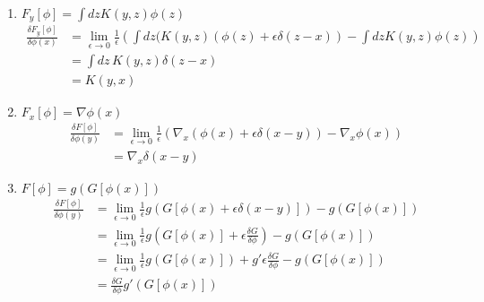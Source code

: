 \documentclass[../main.tex]{subfiles}
\begin{document}
\begin{enumerate}
    
    \item $F_y[\phi]=\int dz K(y,z)\phi(z)$
    \begin{align}
        \frac{\delta F_y[\phi]}{\delta\phi(x)}
           &=\lim_{\epsilon\rightarrow0}\frac{1}{\epsilon}\left(\int dz(K(y,z)(\phi(z)+\epsilon\delta(z-x)) -\int dz K(y,z)\phi(z)\right)\\
           &=\int dz\,K(y,z)\delta(z-x)\\
           &=K(y,x)
    \end{align}
    \item $F_x[\phi]=\nabla\phi(x)$
    \begin{align}
        \frac{\delta F[\phi]}{\delta\phi(y)}
        &=\lim_{\epsilon\rightarrow0}\frac{1}{\epsilon}\left( \nabla_x(\phi(x)+\epsilon\delta(x-y)) - \nabla_x\phi(x)\right)\\
        &=\nabla_x\delta(x-y)
    \end{align}
    \item $F[\phi]=g\left(G[\phi(x)]\right)$
    \begin{align}
        \frac{\delta F[\phi]}{\delta\phi(y)}
        &=\lim_{\epsilon\rightarrow0}\frac{1}{\epsilon}g(G[\phi(x)+\epsilon\delta(x-y)])-g(G[\phi(x)])\\
        &=\lim_{\epsilon\rightarrow0}\frac{1}{\epsilon}g(G[\phi(x)]+\epsilon\frac{\delta G}{\delta \phi})-g(G[\phi(x)])\\
        &=\lim_{\epsilon\rightarrow0}\frac{1}{\epsilon}g(G[\phi(x)])+g' \epsilon\frac{\delta G}{\delta \phi}-g(G[\phi(x)])\\
        &=\frac{\delta G}{\delta \phi}g'(G[\phi(x)])
    \end{align}
    
\end{enumerate}
\end{document}
